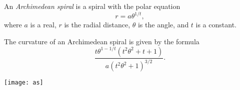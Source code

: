 \documentclass[12pt]{article}
\begin{document}
An \emph{Archimedean spiral} is a spiral with the polar equation
\[
  r=a\theta^{1/t},
\]
where $a$ is a real, $r$ is the radial distance,
$\theta$ is the angle, and $t$ is a constant.

The curvature of an Archimedean spiral is given by the formula
\[
  \frac{t\theta^{1-1/t}(t^2 \theta^2 +t +1)}{a(t^2\theta^2 +1)^{3/2}}.
\]

\begin{center}
\texttt{[image: as]}
\end{center}
\end{document}

